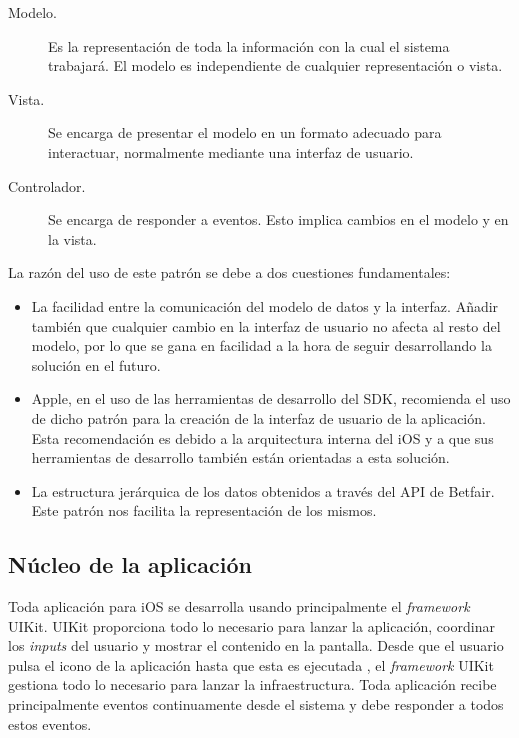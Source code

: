  
 \begin{description}
 	\item [Modelo.] Es la representación de toda la información con la cual el sistema trabajará. El modelo es independiente de cualquier representación o vista.
	\item [Vista.] Se encarga de presentar el modelo en un formato adecuado para interactuar, normalmente mediante una interfaz de usuario.
	\item [Controlador.] Se encarga de responder a eventos. Esto implica cambios en el modelo y en la vista.
\end{description}
 
  La razón del uso de este patrón se debe a dos cuestiones fundamentales:
\begin{itemize}
	\item La facilidad entre la comunicación del %
	modelo de datos y la interfaz. Añadir también que cualquier cambio en la interfaz de usuario no afecta al resto del modelo, por lo que se gana en facilidad a la hora de seguir desarrollando la solución en el futuro.
	\item Apple, en el uso de las herramientas de desarrollo del SDK, recomienda el uso de dicho patrón para la creación de la interfaz de usuario de la aplicación. Esta recomendación es debido a la arquitectura interna del iOS y a que sus herramientas de desarrollo también están orientadas a esta solución.
	\item La estructura jerárquica de los datos obtenidos a través del API de Betfair. Este patrón nos facilita la representación de los mismos.
\end{itemize}


\subsection{Núcleo de la aplicación}
	Toda aplicación para iOS se desarrolla usando principalmente el \emph{framework} UIKit. UIKit proporciona todo lo necesario para lanzar la aplicación, coordinar los \emph{inputs} del usuario y mostrar el contenido en la pantalla. 
	Desde que el usuario pulsa el icono de la aplicación hasta que esta es ejecutada , el \emph{framework} UIKit gestiona todo lo necesario para lanzar la infraestructura. Toda aplicación recibe principalmente eventos continuamente desde el sistema y debe responder a todos estos eventos. 
	

